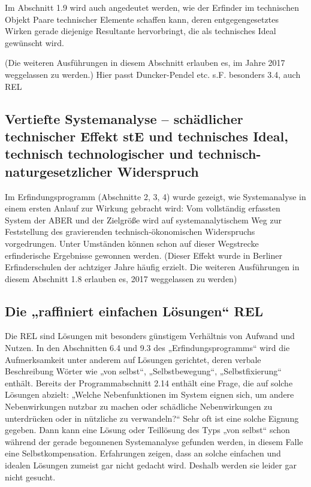 \documentclass[12pt,a4paper]{article}
\begin{document}
Im Abschnitt 1.9 wird auch angedeutet werden, wie der Erfinder im technischen
Objekt Paare technischer Elemente schaffen kann, deren entgegengesetztes
Wirken gerade diejenige Resultante hervorbringt, die als technisches Ideal
gewünscht wird.

(Die weiteren Ausführungen in diesem Abschnitt erlauben es, im Jahre 2017
weggelassen zu werden.) Hier passt Duncker-Pendel etc. s.F. besonders 3.4,
auch REL

\subsection{Vertiefte Systemanalyse – schädlicher technischer Effekt stE und
technisches Ideal, technisch technologischer und technisch-naturgesetzlicher
Widerspruch}

Im Erfindungsprogramm (Abschnitte 2, 3, 4) wurde gezeigt, wie Systemanalyse in
einem ersten Anlauf zur Wirkung gebracht wird: Vom vollständig erfassten
System der ABER und der Zielgröße wird auf systemanalytischem Weg zur
Feststellung des gravierenden technisch-ökonomischen Widerspruchs
vorgedrungen. Unter Umständen können schon auf dieser Wegstrecke erfinderische
Ergebnisse gewonnen werden. (Dieser Effekt wurde in Berliner Erfinderschulen
der achtziger Jahre häufig erzielt. Die weiteren Ausführungen in diesem
Abschnitt 1.8 erlauben es, 2017 weggelassen zu werden)

\subsection{Die „raffiniert einfachen Lösungen“ REL}

Die REL sind Lösungen mit besonders günstigem Verhältnis von Aufwand und
Nutzen. In den Abschnitten 6.4 und 9.3 des „Erfindungsprogramms“ wird die
Aufmerksamkeit unter anderem auf Lösungen gerichtet, deren verbale
Beschreibung Wörter wie „von selbst“, „Selbstbewegung“, „Selbstfixierung“
enthält. Bereits der Programmabschnitt 2.14 enthält eine Frage, die auf solche
Lösungen abzielt: „Welche Nebenfunktionen im System eignen sich, um andere
Nebenwirkungen nutzbar zu machen oder schädliche Nebenwirkungen zu
unterdrücken oder in nützliche zu verwandeln?“ Sehr oft ist eine solche
Eignung gegeben. Dann kann eine Lösung oder Teillösung des Typs „von selbst“
schon während der gerade begonnenen Systemanalyse gefunden werden, in diesem
Falle eine Selbstkompensation. Erfahrungen zeigen, dass an solche einfachen
und idealen Lösungen zumeist gar nicht gedacht wird. Deshalb werden sie leider
gar nicht gesucht.
\end{document}
